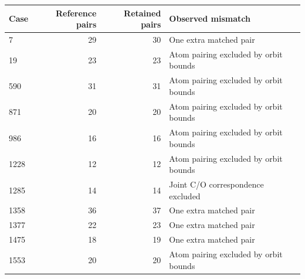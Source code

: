 \begin{tabular}{lrrl}\toprule
Case & Reference pairs & Retained pairs & Observed mismatch\\\midrule
7 & 29 & 30 & One extra matched pair \\
19 & 23 & 23 & Atom pairing excluded by orbit bounds \\
590 & 31 & 31 & Atom pairing excluded by orbit bounds \\
871 & 20 & 20 & Atom pairing excluded by orbit bounds \\
986 & 16 & 16 & Atom pairing excluded by orbit bounds \\
1228 & 12 & 12 & Atom pairing excluded by orbit bounds \\
1285 & 14 & 14 & Joint C/O correspondence excluded \\
1358 & 36 & 37 & One extra matched pair \\
1377 & 22 & 23 & One extra matched pair \\
1475 & 18 & 19 & One extra matched pair \\
1553 & 20 & 20 & Atom pairing excluded by orbit bounds \\
\bottomrule\end{tabular}
